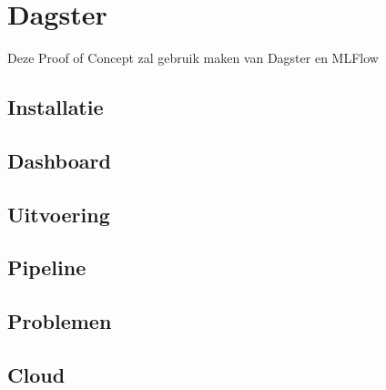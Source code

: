 \section{Dagster}
Deze Proof of Concept zal gebruik maken van Dagster en MLFlow
\subsection{Installatie}
\subsection{Dashboard}
\subsection{Uitvoering}
\subsection{Pipeline}
\subsection{Problemen}
\subsection{Cloud}